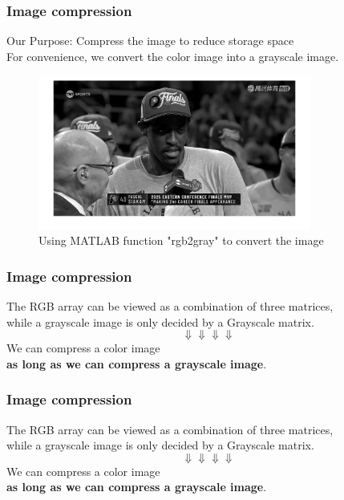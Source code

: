 \documentclass{beamer} %
\begin{document}
\begin{frame}
	\frametitle{Image compression}
	{\color{blue}Our Purpose: Compress the image to reduce storage space}\\
	For convenience, we convert the color image into a grayscale image.
	\begin{figure}
		\centering
		\includegraphics[width=0.8\textwidth]{fig/Siakam_gray.png} %
		\caption{Using MATLAB function "rgb2gray" to convert the image}
		\label{fig:Siakam_gray}
	\end{figure}
\end{frame}

\begin{frame}
	\frametitle{Image compression}
	The RGB array can be viewed as a combination of three matrices, \\
	while a grayscale image is only decided by a Grayscale matrix.
	$$\Downarrow\Downarrow\Downarrow\Downarrow$$
	We can compress a color image \\
	\textbf{as long as we can compress a grayscale image}.
\end{frame}

\begin{frame}
	\frametitle{Image compression}
	The RGB array can be viewed as a combination of three matrices, \\
	while a grayscale image is only decided by a Grayscale matrix.
	$$\Downarrow\Downarrow\Downarrow\Downarrow$$
	We can compress a color image \\
	\textbf{as long as we can compress a grayscale image}.
	\\ \ \\\ \\
\end{frame}
\end{document}
